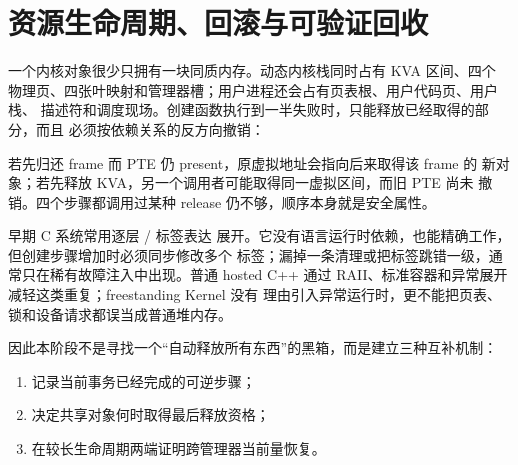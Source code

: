 \section{资源生命周期、回滚与可验证回收}

一个内核对象很少只拥有一块同质内存。动态内核栈同时占有 KVA 区间、四个
物理页、四张叶映射和管理器槽；用户进程还会占有页表根、用户代码页、用户栈、
描述符和调度现场。创建函数执行到一半失败时，只能释放已经取得的部分，而且
必须按依赖关系的反方向撤销：

\begin{center}
\end{center}

若先归还 frame 而 PTE 仍 present，原虚拟地址会指向后来取得该 frame 的
新对象；若先释放 KVA，另一个调用者可能取得同一虚拟区间，而旧 PTE 尚未
撤销。四个步骤都调用过某种 release 仍不够，顺序本身就是安全属性。

早期 C 系统常用逐层 / 标签表达
展开。它没有语言运行时依赖，也能精确工作，但创建步骤增加时必须同步修改多个
标签；漏掉一条清理或把标签跳错一级，通常只在稀有故障注入中出现。普通 hosted
C++ 通过 RAII、标准容器和异常展开减轻这类重复；freestanding Kernel 没有
理由引入异常运行时，更不能把页表、锁和设备请求都误当成普通堆内存。

因此本阶段不是寻找一个“自动释放所有东西”的黑箱，而是建立三种互补机制：

\begin{enumerate}[label=\arabic*.]
  \item {} 记录当前事务已经完成的可逆步骤；
  \item {} 决定共享对象何时取得最后释放资格；
  \item {} 在较长生命周期两端证明跨管理器当前量恢复。
\end{enumerate}


